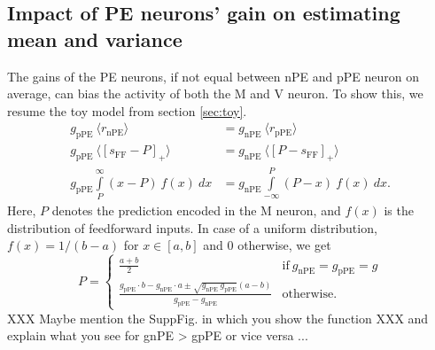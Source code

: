 \documentclass[10pt,a4paper,draft]{article}
\begin{document}
\subsection{Impact of PE neurons' gain on estimating mean and variance}\label{sec:impact_gain}\label{sec:gain_impact}
%
The gains of the PE neurons, if not equal between nPE and pPE neuron on average, can bias the activity of both the M and V neuron. To show this, we resume the toy model from section \ref{sec:toy}. 
%
\begin{align}
\label{eq:condition_mean_gain_equal}
g_\mathrm{pPE}\ \langle r_\mathrm{nPE}\rangle &= g_\mathrm{nPE}\ \langle r_\mathrm{pPE}\rangle \\
g_\mathrm{pPE}\ \langle \left[ s_\mathrm{FF}-P\right]_+\rangle &= g_\mathrm{nPE}\ \langle \left[ P-s_\mathrm{FF}\right]_+\rangle \nonumber\\
g_\mathrm{pPE} \int\limits_P^{\infty} \left( x-P\right)\ f(x)\ dx &= g_\mathrm{nPE} \int\limits_{-\infty}^P \left( P-x\right)\ f(x)\ dx. \nonumber
\end{align}
%
Here, $P$ denotes the prediction encoded in the M neuron, and $f(x)$ is the distribution of feedforward inputs. In case of a uniform distribution, $f(x) = 1/(b-a)$ for $x\in [a,b]$ and $0$ otherwise, we get
%
\begin{equation}
\label{eq:prediction_gain}
    P=
    \begin{cases}
      \frac{a + b}{2} & \text{if}\ g_\mathrm{nPE} = g_\mathrm{pPE} = g \\
      \frac{g_\mathrm{pPE}\cdot b - g_\mathrm{nPE}\cdot a \pm \sqrt{g_\mathrm{nPE}\ g_\mathrm{pPE}} (a-b)}{g_\mathrm{pPE} - g_\mathrm{nPE}} & \text{otherwise.}
    \end{cases}
\end{equation}
%
XXX Maybe mention the SuppFig. in which you show the function XXX and explain what you see for gnPE > gpPE or vice versa ...
\end{document}

